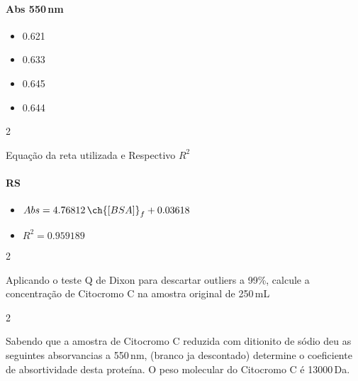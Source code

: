 \documentclass[\mainfilename]{subfiles}
\begin{document}
\begin{questionBox}
\begin{center}
\begin{tabular}{c *{5}{c}}
            \\\bottomrule
            
        \end{tabular}
    \end{center}

    \paragraph{Abs 550\,\unit{\nano\metre}}
    \begin{itemize}
        \item 0.621
        \item 0.633
        \item 0.645
        \item 0.644
    \end{itemize}
    
\end{questionBox}

\begin{questionBox}2{}
    
    Equação da reta utilizada e Respectivo \(R^2\)

    

    \paragraph{RS} 
    \begin{itemize}
        \item \(Abs = 4.76812\,\ch{[BSA]}_f + 0.03618\)
        \item \( R^2 = 0.959189 \)
    \end{itemize}
    
\end{questionBox}

\begin{questionBox}2{}
    
    Aplicando o teste Q de Dixon para descartar outliers a 99\%, calcule a concentração de Citocromo C na amostra original de 250\,\unit{\milli\liter}
    
\end{questionBox}

\begin{questionBox}2{}
    
    Sabendo que a amostra de Citocromo C reduzida com ditionito de sódio deu as seguintes absorvancias a 550\,\unit{\nano\metre}, (branco ja descontado) determine o coeficiente de absortividade desta proteína. O peso molecular do Citocromo C é 13000\,\unit{\dalton}.
    
\end{questionBox}
\end{document}
